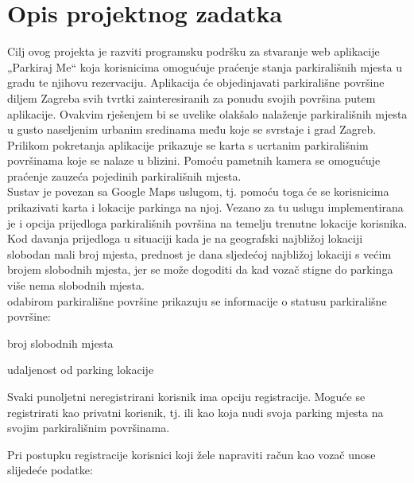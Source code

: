 \chapter{Opis projektnog zadatka}
		

		Cilj ovog projekta je razviti programsku podršku za stvaranje web aplikacije „Parkiraj Me“ koja korisnicima omogućuje praćenje stanja parkirališnih mjesta u gradu te njihovu rezervaciju.
		Aplikacija će objedinjavati parkirališne površine diljem Zagreba svih tvrtki zainteresiranih za ponudu svojih površina putem aplikacije.
		Ovakvim rješenjem bi se uvelike olakšalo nalaženje parkirališnih mjesta u gusto naseljenim urbanim sredinama među koje se svrstaje i grad Zagreb.\\
		
		\noindent Prilikom pokretanja aplikacije prikazuje se karta s ucrtanim parkirališnim površinama koje se nalaze u blizini. Pomoću pametnih kamera se omogućuje praćenje zauzeća pojedinih parkirališnih mjesta.\\
		
		\noindent Sustav je povezan sa Google Maps uslugom, tj. pomoću toga će se korisnicima prikazivati karta i lokacije parkinga na njoj. Vezano za tu uslugu implementirana je i opcija prijedloga parkirališnih površina na temelju trenutne lokacije korisnika.\\
		\noindent Kod davanja prijedloga u situaciji kada je na geografski najbližoj lokaciji slobodan mali broj mjesta, prednost je dana sljedećoj najbližoj lokaciji s većim brojem slobodnih mjesta, jer se može dogoditi da kad vozač stigne do parkinga više nema slobodnih mjesta.\\ 
		
		
		\noindent {}
		odabirom parkirališne površine prikazuju se informacije o statusu parkirališne površine:
		
		\begin{packed_item}
			\item broj slobodnih mjesta
			\item udaljenost od parking lokacije
		\end{packed_item}		
		
		\noindent Svaki punoljetni neregistrirani korisnik ima opciju registracije. Moguće se registrirati kao privatni korisnik, tj.  ili kao  koja nudi svoja parking mjesta na svojim parkirališnim površinama.
		
		\noindent Pri postupku registracije korisnici koji žele napraviti račun kao vozač unose slijedeće podatke: 
		
